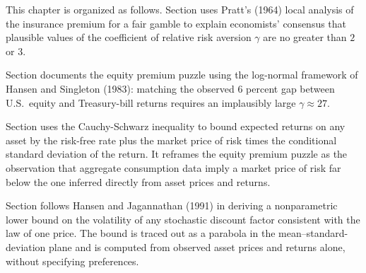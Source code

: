 %
%
%
%
%
%

This chapter is organized as follows.
Section  uses Pratt's (1964) local analysis of the insurance premium
for a fair gamble to explain economists' consensus that plausible values of the coefficient
of relative risk aversion $\gamma$ are no greater than $2$ or $3$.

Section  documents the equity premium puzzle using the log-normal
framework of Hansen and Singleton (1983): matching the observed 6 percent gap between
U.S.\ equity and Treasury-bill returns requires an implausibly large $\gamma \approx 27$.

Section  uses the Cauchy-Schwarz inequality to bound expected
returns on any asset by the risk-free rate plus the market price of risk times the
conditional standard deviation of the return.  It reframes the equity premium puzzle
as the observation that aggregate consumption data imply a market price of risk far
below the one inferred directly from asset prices and returns.

Section  follows Hansen and Jagannathan (1991) in deriving a
nonparametric lower bound on the volatility of any stochastic discount factor consistent
with the law of one price.  The bound is traced out as a parabola in the
mean--standard-deviation plane and is computed from observed asset prices and returns
alone, without specifying preferences.

